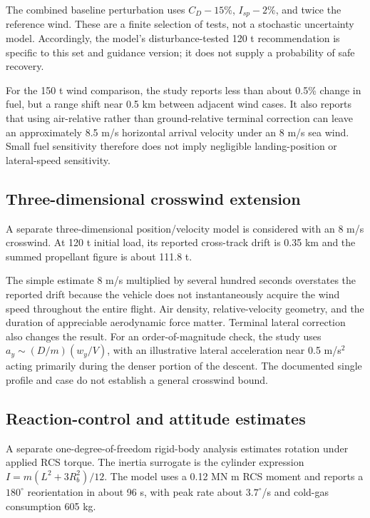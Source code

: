 \documentclass[11pt,a4paper]{article}
\begin{document}


The combined baseline perturbation uses $C_D-15\%$, $I_{sp}-2\%$, and twice the reference wind. These are a finite selection of tests, not a stochastic uncertainty model. Accordingly, the model's disturbance-tested 120 t recommendation is specific to this set and guidance version; it does not supply a probability of safe recovery.



For the 150 t wind comparison, the study reports less than about 0.5\% change in fuel, but a range shift near 0.5 km between adjacent wind cases. It also reports that using air-relative rather than ground-relative terminal correction can leave an approximately 8.5 m/s horizontal arrival velocity under an 8 m/s sea wind. Small fuel sensitivity therefore does not imply negligible landing-position or lateral-speed sensitivity.

\subsection{Three-dimensional crosswind extension}
A separate three-dimensional position/velocity model is considered with an 8 m/s crosswind. At 120 t initial load, its reported cross-track drift is 0.35 km and the summed propellant figure is about 111.8 t.



The simple estimate $8$ m/s multiplied by several hundred seconds overstates the reported drift because the vehicle does not instantaneously acquire the wind speed throughout the entire flight. Air density, relative-velocity geometry, and the duration of appreciable aerodynamic force matter. Terminal lateral correction also changes the result. For an order-of-magnitude check, the study uses $a_y\sim(D/m)(w_y/V)$, with an illustrative lateral acceleration near 0.5 m/s$^2$ acting primarily during the denser portion of the descent. The documented single profile and case do not establish a general crosswind bound.

\subsection{Reaction-control and attitude estimates}
A separate one-degree-of-freedom rigid-body analysis estimates rotation under applied RCS torque. The inertia surrogate is the cylinder expression $I=m(L^2+3R_b^2)/12$. The model uses a 0.12 MN m RCS moment and reports a $180^\circ$ reorientation in about 96 s, with peak rate about $3.7^\circ$/s and cold-gas consumption 605 kg.
\end{document}
